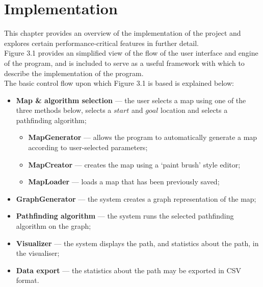 \documentclass[12pt,notitlepage]{report}
\begin{document}
\cleardoublepage
\chapter{Implementation}

This chapter provides an overview of the implementation of the project and explores certain performance-critical features in further detail.\\

\noindent
Figure 3.1 provides an simplified view of the flow of the user interface and engine of the program, and is included to serve as a useful framework with which to describe the implementation of the program.\\

\noindent
The basic control flow upon which Figure 3.1 is based is explained below:
\begin{itemize}
\item {\bfseries Map \& algorithm selection} --- the user selects a map using one of the three methods below, selects a $start$ and $goal$ location and selects a pathfinding algorithm;
  \begin{itemize}
  \item {\bfseries MapGenerator} --- allows the program to automatically generate a map according to user-selected parameters;
  \item {\bfseries MapCreator} --- creates the map using a `paint brush' style editor;
  \item {\bfseries MapLoader} --- loads a map that has been previously saved;
  \end{itemize}
\item {\bfseries GraphGenerator} --- the system creates a graph representation of the map;
\item {\bfseries Pathfinding algorithm} --- the system runs the selected pathfinding algorithm on the graph;
\item {\bfseries Visualizer} --- the system displays the path, and statistics about the path, in the visualiser;
\item {\bfseries Data export} --- the statistics about the path may be exported in CSV format.
\end{itemize}
\end{document}
